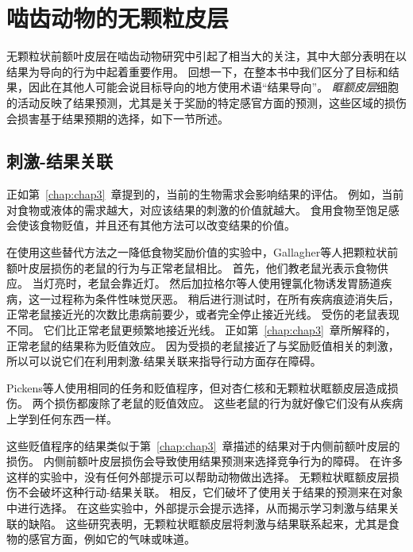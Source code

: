 \section{啮齿动物的无颗粒皮层}

无颗粒状前额叶皮层在啮齿动物研究中引起了相当大的关注，其中大部分表明在以结果为导向的行为中起着重要作用。
回想一下，在整本书中我们区分了目标和结果，因此在其他人可能会说目标导向的地方使用术语“结果导向”。
\textit{眶额皮层}细胞的活动反映了结果预测，尤其是关于奖励的特定感官方面的预测\cite{schoenbaum1998orbitofrontal}，这些区域的损伤会损害基于结果预期的选择，如下一节所述。



\subsection{刺激-结果关联}

正如第~\ref{chap:chap3}~章提到的，当前的生物需求会影响结果的评估。
例如，当前对食物或液体的需求越大，对应该结果的刺激的价值就越大。
食用食物至饱足感会使该食物贬值，并且还有其他方法可以改变结果的价值。\par


在使用这些替代方法之一降低食物奖励价值的实验中，Gallagher等人\cite{gallagher1999orbitofrontal}把颗粒状前额叶皮层损伤的老鼠的行为与正常老鼠相比。
首先，他们教老鼠光表示食物供应。
当灯亮时，老鼠会靠近灯。
然后加拉格尔等人使用锂氯化物诱发胃肠道疾病，这一过程称为条件性味觉厌恶。
稍后进行测试时，在所有疾病痕迹消失后，正常老鼠接近光的次数比患病前要少，或者完全停止接近光线。
受伤的老鼠表现不同。
它们比正常老鼠更频繁地接近光线。
正如第~\ref{chap:chap3}~章所解释的，正常老鼠的结果称为贬值效应。
因为受损的老鼠接近了与奖励贬值相关的刺激，所以可以说它们在利用刺激-结果关联来指导行动方面存在障碍。\par


Pickens等人\cite{pickens2005orbitofrontal,pickens2003different}使用相同的任务和贬值程序，但对杏仁核和无颗粒状眶额皮层造成损伤。
两个损伤都废除了老鼠的贬值效应。
这些老鼠的行为就好像它们没有从疾病上学到任何东西一样。\par


这些贬值程序的结果类似于第~\ref{chap:chap3}~章描述的结果对于内侧前额叶皮层的损伤。
内侧前额叶皮层损伤会导致使用结果预测来选择竞争行为的障碍。
在许多这样的实验中，没有任何外部提示可以帮助动物做出选择。
无颗粒状眶额皮层损伤不会破坏这种行动-结果关联\cite{ostlund2007orbitofrontal}。
相反，它们破坏了使用关于结果的预测来在对象中进行选择。
在这些实验中，外部提示会提示选择，从而揭示学习刺激与结果关联的缺陷。
这些研究表明，无颗粒状眶额皮层将刺激与结果联系起来，尤其是食物的感官方面，例如它的气味或味道。\par


